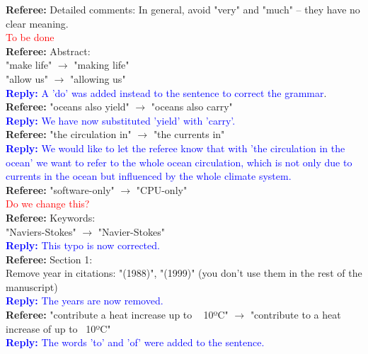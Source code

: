 \documentclass[]{article}
\begin{document}
\textbf{Referee:} Detailed comments: 
In general, avoid "very" and "much" -- they have no clear meaning. \\
\textcolor{red}{To be done} \\

\textbf{Referee:} Abstract: \\
"make life" $\rightarrow$ "making life" \\
"allow us" $\rightarrow$ "allowing us" \\
\textcolor{blue}{\textbf{Reply:} A 'do' was added instead to the sentence to correct the grammar}. \\

\textbf{Referee:} "oceans also yield" $\rightarrow$ "oceans also carry" \\
\textcolor{blue}{\textbf{Reply:} We have now substituted 'yield' with 'carry'.} \\

\textbf{Referee:} "the circulation in" $\rightarrow$ "the currents in" \\
\textcolor{blue}{\textbf{Reply:} We would like to let the referee know that with 'the circulation in the ocean' we want to refer to the whole ocean circulation, which is not only due to currents in the ocean but influenced by the whole climate system.} \\	

\textbf{Referee:} "software-only" $\rightarrow$ "CPU-only" \\
\textcolor{red}{Do we change this?} \\

\textbf{Referee:} Keywords: \\ "Naviers-Stokes" $\rightarrow$ "Navier-Stokes" \\
\textcolor{blue}{\textbf{Reply:} This typo is now corrected.} \\

\textbf{Referee:} Section 1: \\
Remove year in citations: "(1988)", "(1999)" (you don't use them in the rest of the manuscript) \\
\textcolor{blue}{\textbf{Reply:} The years are now removed.} \\

\textbf{Referee:} "contribute a heat increase up to ~ 10ºC" $\rightarrow$ "contribute to a heat increase of up to ~10ºC" \\
\textcolor{blue}{\textbf{Reply:} The words 'to' and 'of' were added to the sentence.} \\
\end{document}
